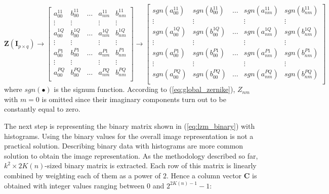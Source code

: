\documentclass[]{spie}  %
\begin{document}
\begin{equation}
\mathbf{Z} ( \mathbf{I}_{p\times q} )
 \longrightarrow
 \begin{bmatrix}
a_{00}^{11} & b_{00}^{11} & \hdots & a_{nm}^{11}  & b_{nm}^{11} \\
  \vdots  & \vdots & & \vdots  & \vdots\\
a_{00}^{1Q} & b_{00}^{1Q} & \hdots & a_{nm}^{1Q}  & b_{nm}^{1Q} \\
  \vdots  & \vdots & & \vdots  & \vdots\\
a_{00}^{P1} & b_{00}^{P1} & \hdots & a_{nm}^{P1}  & b_{nm}^{P1} \\
  \vdots  & \vdots & & \vdots  & \vdots\\
a_{00}^{PQ} & b_{00}^{PQ} & \hdots & a_{nm}^{PQ}  & b_{nm}^{PQ} \\
 \end{bmatrix}
  \longrightarrow
  \begin{bmatrix}
sgn(a_{00}^{11}) & sgn(b_{00}^{11}) & \hdots & sgn(a_{nm}^{11}) & sgn(b_{nm}^{11}) \\
  \vdots  & \vdots & & \vdots  & \vdots\\
sgn(a_{00}^{1Q}) & sgn(b_{00}^{1Q}) & \hdots & sgn(a_{nm}^{1Q}) & sgn(b_{nm}^{1Q}) \\
  \vdots  & \vdots & & \vdots  & \vdots\\
sgn(a_{00}^{P1}) & sgn(b_{00}^{P1}) & \hdots & sgn(a_{nm}^{P1}) & sgn(b_{nm}^{P1}) \\
  \vdots  & \vdots & & \vdots  & \vdots\\
sgn(a_{00}^{PQ}) & sgn(b_{00}^{PQ}) & \hdots & sgn(a_{nm}^{PQ}) & sgn(b_{nm}^{PQ}) \\
 \end{bmatrix}
 \label{eq:lzm_binary}
\end{equation}
where $sgn(\bullet)$ is the signum function. According to (\ref{eq:global_zernike}), $Z_{nm}$ with $m = 0$ is omitted since their imaginary components turn out to be constantly equal to zero. 

The next step is representing the binary matrix shown in (\ref{eq:lzm_binary}) with histograms. Using the binary values for the overall image representation is not a practical solution. Describing binary data with histograms are more common solution to obtain the image representation. As the methodology described so far, $k^2\times 2K(n)$-sized binary matrix is extracted. Each row of this matrix is linearly combined by weighting each of them as a power of $2$. Hence a column vector $\mathbf{C}$ is obtained with integer values ranging between $0$ and $2^{2K(n)-1}-1$:
\end{document}
